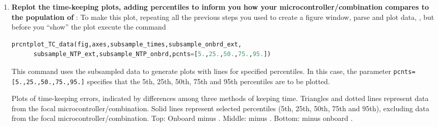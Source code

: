 \begin{enumerate}
	\item \textbf{Replot the time-keeping plots, adding percentiles to inform you how your microcontroller/\rtc combination compares to the population of \rtcs}:
	To make this plot, repeating all the previous steps you used to create a figure window, parse and plot data, \etc, but before you ``show'' the plot execute the command
\begin{lstlisting}[language=Python]
prcntplot_TC_data(fig,axes,subsample_times,subsample_onbrd_ext,
      subsample_NTP_ext,subsample_NTP_onbrd,pcnts=[5.,25.,50.,75.,95.])
\end{lstlisting}
	This command uses the subsampled data to generate plots with lines for specified percentiles.
	In this case, the parameter \lstinline{pcnts=[5.,25.,50.,75.,95.]} specifies that the 5th, 25th, 50th, 75th and 95th percentiles are to be plotted.
	\begin{marginfigure}[-19.cm]
	\begin{center}
		\caption[Plots of time-keeping errors]{Plots of time-keeping errors, indicated by differences among three methods of keeping time. 
		Triangles and dotted lines represent data from the focal microcontroller/\rtc combination. 
		Solid lines represent selected percentiles (5th, 25th, 50th, 75th and 95th), excluding data from the focal microcontroller/\rtc combination. 
		Top: Onboard \rtc minus  \rtc. Middle: \ntp minus  \rtc. Bottom: \ntp minus onboard \rtc. }
	\end{center}
\end{marginfigure}


\end{enumerate}
